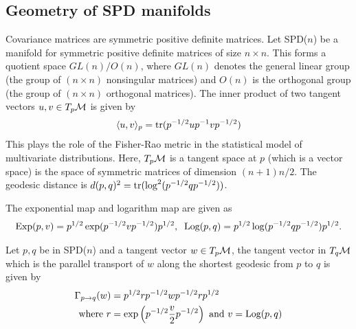 \subsection*{Geometry of SPD manifolds}
Covariance matrices are symmetric positive definite matrices. 
Let SPD($n$) be a manifold for symmetric positive definite matrices of size $n\times n$. This forms a quotient space $GL(n)/O(n)$, where
$GL(n)$ denotes the general linear group (the group of $(n \times n)$ nonsingular matrices) and $O(n)$ is the orthogonal group 
(the group of $(n \times n)$ orthogonal matrices). 
%
The inner product of two tangent vectors $u,v \in T_{p}\mathcal{M}$ is given by 
\begin{equation}
\begin{split}
  \langle u,v \rangle_{p} = \text{tr}(p^{-1/2}up^{-1}vp^{-1/2})
\end{split}
\label{eq:metricSPD}
\end{equation}
This plays the role of the Fisher-Rao metric in the statistical model of multivariate distributions.
Here, $T_{p}\mathcal{M}$ is a tangent space at $p$ (which is a vector space) is the space of symmetric matrices of dimension $(n+1)n/2$.
The geodesic distance is $d(p,q)^{2} = \text{tr}( \log^{2}(p^{-1/2}qp^{-1/2}))$.


The exponential map and logarithm map are  given as 
\begin{equation}
\begin{split}
  \text{Exp}(p,v) = p^{1/2} \exp(p^{-1/2}vp^{-1/2})p^{1/2}, \;\;
  \text{Log}(p,q) = p^{1/2} \log(p^{-1/2}qp^{-1/2})p^{1/2}.
\end{split}
\end{equation}

Let $p, q$ be in SPD($n$) and a tangent vector $w \in T_{p}\mathcal{M}$, the
tangent vector in $T_{q}\mathcal{M}$ which is the parallel transport of $w$ along
the shortest geodesic from $p$ to $q$ is given by 
\begin{equation}
\begin{split}
\Gamma_{p \rightarrow q}(w) &= p^{1/2}rp^{-1/2}wp^{-1/2}rp^{1/2} \\
\text{where } r &= \exp \left (p^{-1/2}\frac{v}{2}p^{-1/2} \right ) \text{ and
}v = \text{Log}(p,q)
\end{split}
\end{equation}

 
